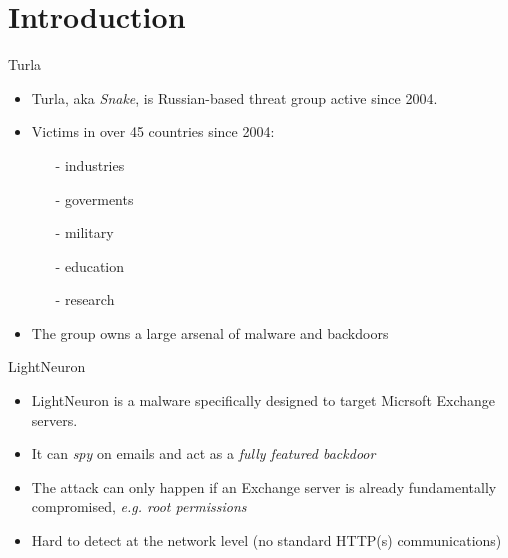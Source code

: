 \section{Introduction}

\begin{frame}[fragile]{Turla}
    \begin{itemize}
      \item Turla, aka \emph{Snake}, is Russian-based threat group active since 2004. \cite{MitreTurla}
      \item Victims in over 45 countries since 2004:
      \begin{itemize}
        \item[-] industries
        \item[-] goverments
        \item[-] military
        \item[-] education
        \item[-] research  
      \end{itemize}
      \item The group owns a large arsenal of malware and backdoors
    \end{itemize}
\end{frame} 

\begin{frame}[fragile]{LightNeuron}
  \begin{itemize}
    \item LightNeuron \cite{Turla19} is a malware specifically designed to target Micrsoft Exchange servers.
    \item It can \emph{spy} on emails and act as a \emph{fully featured backdoor}
    \item The attack can only happen if an Exchange server is already fundamentally compromised, \emph{e.g. root permissions}
    \item Hard to detect at the network level (no standard HTTP(s) communications)
  \end{itemize}
\end{frame}